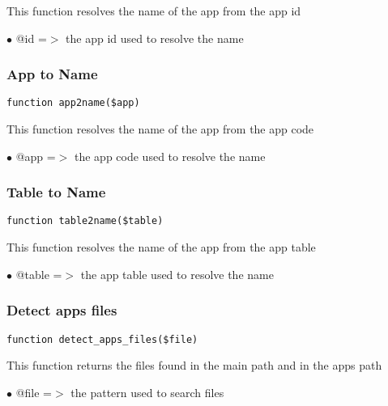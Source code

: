 \documentclass[a4paper]{article}
\begin{document}
This function resolves the name of the app from the app id

\begin{compactitem}
\item[\color{myblue}$\bullet$] @id =$>$ the app id used to resolve the name
\end{compactitem}

\hypertarget{toc42}{}
\subsubsection{App to Name}

\begin{lstlisting}
function app2name($app)
\end{lstlisting}

This function resolves the name of the app from the app code

\begin{compactitem}
\item[\color{myblue}$\bullet$] @app =$>$ the app code used to resolve the name
\end{compactitem}

\hypertarget{toc43}{}
\subsubsection{Table to Name}

\begin{lstlisting}
function table2name($table)
\end{lstlisting}

This function resolves the name of the app from the app table

\begin{compactitem}
\item[\color{myblue}$\bullet$] @table =$>$ the app table used to resolve the name
\end{compactitem}

\hypertarget{toc44}{}
\subsubsection{Detect apps files}

\begin{lstlisting}
function detect_apps_files($file)
\end{lstlisting}

This function returns the files found in the main path and in the apps path

\begin{compactitem}
\item[\color{myblue}$\bullet$] @file =$>$ the pattern used to search files
\end{compactitem}
\end{document}
